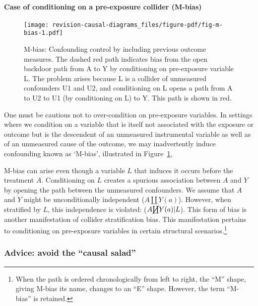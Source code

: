 \documentclass[
  singlecolumn,
  9pt]{article}
\let\oldparagraph\paragraph
\renewcommand{\paragraph}[1]{\oldparagraph{#1}\mbox{}}
\begin{document}
\paragraph{Case of conditioning on a pre-exposure collider
(M-bias)}\label{case-of-conditioning-on-a-pre-exposure-collider-m-bias}

\begin{figure}

{\centering \texttt{[image: revision-causal-diagrams\_files/figure-pdf/fig-m-bias-1.pdf]}

}

\caption{\label{fig-m-bias}M-bias: Confounding control by including
previous outcome measures. The dashed red path indicates bias from the
open backdoor path from A to Y by conditioning on pre-exposure variable
L. The problem arises because L is a collider of unmeasured confounders
U1 and U2, and conditioning on L opens a path from A to U2 to U1 (by
conditioning on L) to Y. This path is shown in red.}

\end{figure}

One must be cautious not to over-condition on pre-exposure variables. In
settings where we condition on a variable that is itself not associated
with the exposure or outcome but is the descendent of an unmeasured
instrumental variable as well as of an unmeasured cause of the outcome,
we may inadvertently induce confounding known as `M-bias', illustrated
in Figure~\ref{fig-m-bias},

M-bias can arise even though a variable \(L\) that induces it occurs
before the treatment \(A\). Conditioning on \(L\) creates a spurious
association between \(A\) and \(Y\) by opening the path between the
unmeasured confounders. We assume that \(A\) and \(Y\) might be
unconditionally independent (\(A \coprod Y(a)\)). However, when
stratified by \(L\), this independence is violated:
(\(A \cancel{\coprod} Y(a)| L\)). This form of bias is another
manifestation of collider stratification bias. This manifestation
pertains to conditioning on pre-exposure variables in certain structural
scenarios.\footnote{When the path is ordered chronologically from left
  to right, the ``M'' shape, giving M-bias its name, changes to an ``E''
  shape. However, the term ``M-bias'' is retained.}

\subsubsection{Advice: avoid the ``causal
salad''}\label{advice-avoid-the-causal-salad}
\end{document}
